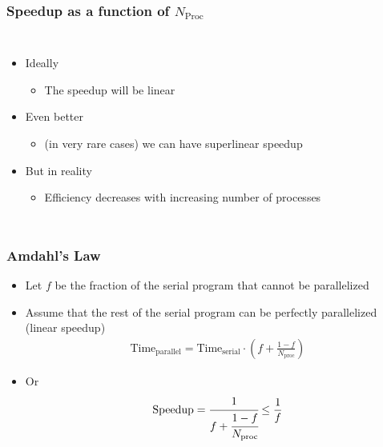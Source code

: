 \documentclass[10pt,t]{beamer}
\begin{document}
\begin{frame}
\frametitle{Speedup as a function of $N_{\mathrm{Proc}}$}
\begin{columns}[c]
\begin{itemize}
\item Ideally
\begin{itemize}
\item The speedup will be linear
\end{itemize}
\item Even better
\begin{itemize}
\item (in very rare cases) we can have superlinear speedup
\end{itemize}
\item But in reality
\begin{itemize}
\item Efficiency decreases with increasing number of processes
\end{itemize}
\end{itemize}
\end{columns}
\end{frame}

\begin{frame}
\frametitle{Amdahl's Law}
\begin{itemize}
\item Let $f$ be the fraction of the serial program that cannot be parallelized
\item Assume that the rest of the serial program can be perfectly parallelized (linear speedup)
\begin{gather*}
\mathrm{Time}_\mathrm{parallel} = \mathrm{Time}_\mathrm{serial}\cdot\left(f +\frac{1-f}{N_\mathrm{proc}}\right)
\end{gather*}
\item Or
\begin{gather*}
\mathrm{Speedup} = \cfrac{1}{f+\cfrac{1-f}{N_\mathrm{proc}}}\le\frac{1}{f}
\end{gather*}
\end{itemize}
\end{frame}
\end{document}
